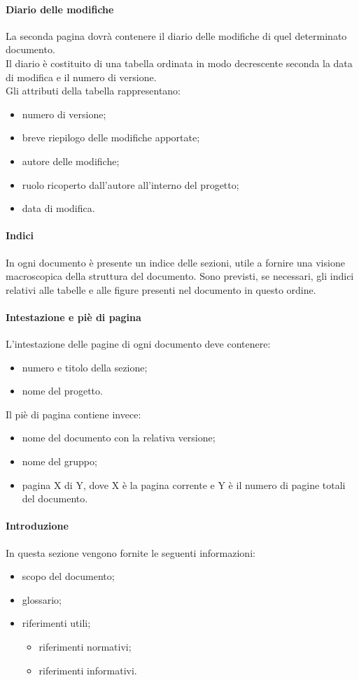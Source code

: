  \paragraph{Diario delle modifiche}
 La seconda pagina dovrà contenere il diario delle modifiche di quel determinato documento.\\
 Il diario è costituito di una tabella ordinata in modo decrescente seconda la data di modifica e il numero di versione.\\
 Gli attributi della tabella rappresentano:
 \begin{itemize}
 	\item numero di versione;
 	\item breve riepilogo delle modifiche apportate;
 	\item autore delle modifiche;
 	\item ruolo ricoperto dall'autore all'interno del progetto;
 	\item data di modifica.
 \end{itemize}
 \paragraph{Indici}
 In ogni documento è presente un indice delle sezioni, utile a fornire una visione macroscopica della struttura del documento. Sono previsti, se necessari, gli indici relativi alle tabelle e alle figure presenti nel documento in questo ordine.

 \paragraph{Intestazione e piè di pagina}
L'intestazione delle pagine di ogni documento deve contenere:
\begin{itemize}
	\item numero e titolo della sezione;
	\item nome del progetto.
\end{itemize}
Il piè di pagina contiene invece:
\begin{itemize}
	\item nome del documento con la relativa versione;
	\item nome del gruppo;
	\item pagina X di Y, dove X è la pagina corrente e Y è il numero di pagine totali del documento.
\end{itemize}
\paragraph{Introduzione}
In questa sezione vengono fornite le seguenti informazioni:
\begin{itemize}
	\item scopo del documento;
	\item glossario;
	\item riferimenti utili;
	\begin{itemize}
		\item riferimenti normativi;
		\item riferimenti informativi.
	\end{itemize}
\end{itemize}
